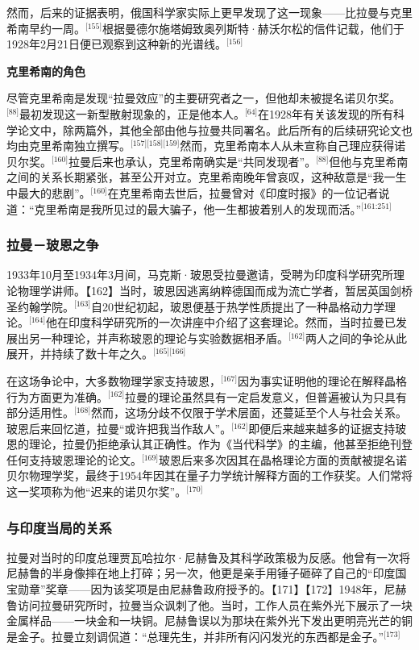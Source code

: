 然而，后来的证据表明，俄国科学家实际上更早发现了这一现象——比拉曼与克里希南早约一周。\(^\text{[155]}\)根据曼德尔施塔姆致奥列斯特·赫沃尔松的信件记载，他们于1928年2月21日便已观察到这种新的光谱线。\(^\text{[156]}\)

\textbf{克里希南的角色}

尽管克里希南是发现“拉曼效应”的主要研究者之一，但他却未被提名诺贝尔奖。\(^\text{[88]}\)最初发现这一新型散射现象的，正是他本人。\(^\text{[64]}\)在1928年有关该发现的所有科学论文中，除两篇外，其他全部由他与拉曼共同署名。此后所有的后续研究论文也均由克里希南独立撰写。\(^\text{[157][158][159]}\)然而，克里希南本人从未宣称自己理应获得诺贝尔奖。\(^\text{[160]}\)拉曼后来也承认，克里希南确实是“共同发现者”。\(^\text{[88]}\)但他与克里希南之间的关系长期紧张，甚至公开对立。克里希南晚年曾哀叹，这种敌意是“我一生中最大的悲剧”。\(^\text{[160]}\)在克里希南去世后，拉曼曾对《印度时报》的一位记者说道：“克里希南是我所见过的最大骗子，他一生都披着别人的发现而活。”\(^\text{[161:251]}\)
\subsubsection{拉曼－玻恩之争}
1933年10月至1934年3月间，马克斯·玻恩受拉曼邀请，受聘为印度科学研究所理论物理学讲师。【162】当时，玻恩因逃离纳粹德国而成为流亡学者，暂居英国剑桥圣约翰学院。\(^\text{[163]}\)自20世纪初起，玻恩便基于热学性质提出了一种晶格动力学理论。\(^\text{[164]}\)他在印度科学研究所的一次讲座中介绍了这套理论。然而，当时拉曼已发展出另一种理论，并声称玻恩的理论与实验数据相矛盾。\(^\text{[162]}\)两人之间的争论从此展开，并持续了数十年之久。\(^\text{[165][166]}\)

在这场争论中，大多数物理学家支持玻恩，\(^\text{[167]}\)因为事实证明他的理论在解释晶格行为方面更为准确。\(^\text{[162]}\)拉曼的理论虽然具有一定启发意义，但普遍被认为只具有部分适用性。\(^\text{[168]}\)然而，这场分歧不仅限于学术层面，还蔓延至个人与社会关系。玻恩后来回忆道，拉曼“或许把我当作敌人”。\(^\text{[162]}\)即便后来越来越多的证据支持玻恩的理论，拉曼仍拒绝承认其正确性。作为《当代科学》的主编，他甚至拒绝刊登任何支持玻恩理论的论文。\(^\text{[169]}\)玻恩后来多次因其在晶格理论方面的贡献被提名诺贝尔物理学奖，最终于1954年因其在量子力学统计解释方面的工作获奖。人们常将这一奖项称为他“迟来的诺贝尔奖”。\(^\text{[170]}\)
\subsubsection{与印度当局的关系}
拉曼对当时的印度总理贾瓦哈拉尔·尼赫鲁及其科学政策极为反感。他曾有一次将尼赫鲁的半身像摔在地上打碎；另一次，他更是亲手用锤子砸碎了自己的“印度国宝勋章”奖章——因为该奖项是由尼赫鲁政府授予的。【171】【172】1948年，尼赫鲁访问拉曼研究所时，拉曼当众讽刺了他。当时，工作人员在紫外光下展示了一块金属样品——一块金和一块铜。尼赫鲁误以为那块在紫外光下发出更明亮光芒的铜是金子。拉曼立刻调侃道：“总理先生，并非所有闪闪发光的东西都是金子。”\(^\text{[173]}\)

